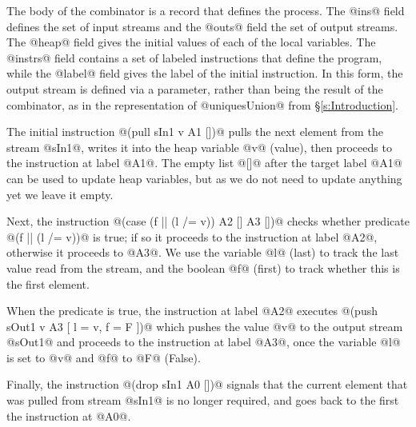 The body of the combinator is a record that defines the process. The @ins@ field defines the set of input streams and the @outs@ field the set of output streams. The @heap@ field gives the initial values of each of the local variables. The @instrs@ field contains a set of labeled instructions that define the program, while the @label@ field gives the label of the initial instruction. In this form, the output stream is defined via a parameter, rather than being the result of the combinator, as in the representation of @uniquesUnion@ from \S\ref{s:Introduction}. 

The initial instruction @(pull sIn1 v A1 [])@ pulls the next element from the stream @sIn1@, writes it into the heap variable @v@ (value), then proceeds to the instruction at label @A1@. The empty list @[]@ after the target label @A1@ can be used to update heap variables, but as we do not need to update anything yet we leave it empty. 

Next, the instruction @(case (f || (l /= v)) A2 [] A3 [])@ checks whether predicate @(f || (l /= v))@ is true; if so it proceeds to the instruction at label @A2@, otherwise it proceeds to @A3@. We use the variable @l@ (last) to track the last value read from the stream, and the boolean @f@ (first) to track whether this is the first element.

When the predicate is true, the instruction at label @A2@ executes
@(push sOut1 v A3 [ l = v, f = F ])@
which pushes the value @v@ to the output stream @sOut1@ and proceeds to the instruction at label @A3@, once the variable @l@ is set to @v@ and @f@ to @F@ (False).

Finally, the instruction @(drop sIn1 A0 [])@ signals that the current element that was pulled from stream @sIn1@ is no longer required, and goes back to the first the instruction at @A0@. 


